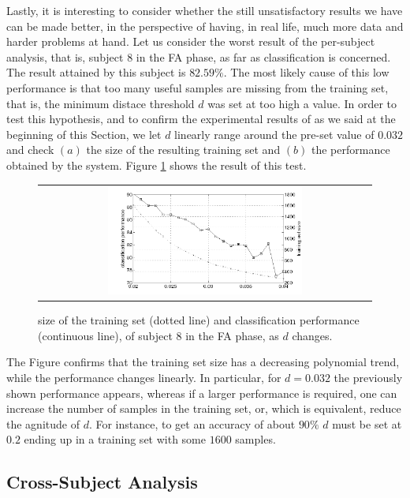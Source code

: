 Lastly, it is interesting to consider whether the still unsatisfactory
results we have can be made better, in the perspective of having, in
real life, much more data and harder problems at hand. Let us consider
the worst result of the per-subject analysis, that is, subject $8$ in
the FA phase, as far as classification is concerned. The result
attained by this subject is $82.59\%$. The most likely cause of this
low performance is that too many useful samples are missing from the
training set, that is, the minimum distace threshold $d$ was set at
too high a value. In order to test this hypothesis, and to confirm the
experimental results of
\cite{2008.BioCyb} as we said at the beginning of this Section, we
let $d$ linearly range around the pre-set value of $0.032$ and check
$(a)$ the size of the resulting training set and $(b)$ the performance
obtained by the system. Figure \ref{fig:subj8} shows the result of
this test.

\begin{figure}[!ht] \centering
  \begin{tabular}{c}
    \includegraphics[width=0.6\textwidth]{figs/subj8} \\
  \end{tabular}
  \caption{size of the training set (dotted line) and classification
    performance (continuous line), of subject $8$ in the FA phase, as
    $d$ changes.}
  \label{fig:subj8}
\end{figure}

The Figure confirms that the training set size has a decreasing
polynomial trend, while the performance changes linearly. In
particular, for $d=0.032$ the previously shown performance appears,
whereas if a larger performance is required, one can increase the
number of samples in the training set, or, which is equivalent, reduce
the agnitude of $d$. For instance, to get an accuracy of about $90\%$
$d$ must be set at $0.2$ ending up in a training set with some $1600$
samples.

\subsection{Cross-Subject Analysis}

